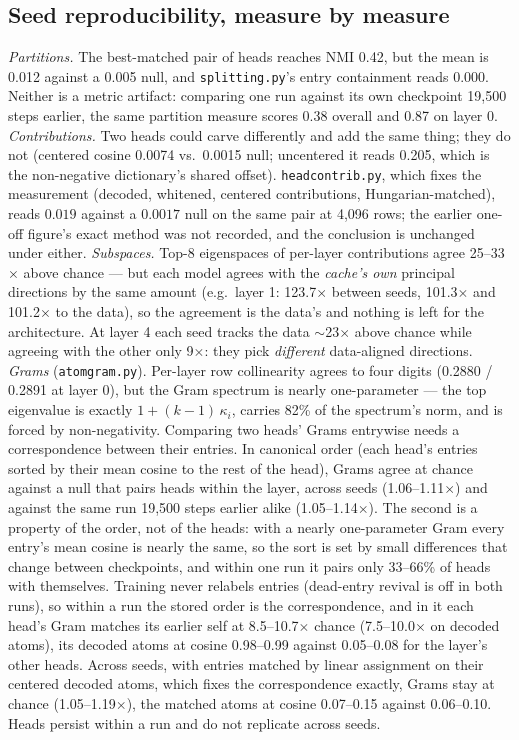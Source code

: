 \subsection{Seed reproducibility, measure by measure}
\label{sec:seedsdetail}

\emph{Partitions.} The best-matched pair of heads reaches NMI 0.42, but
the mean is 0.012 against a 0.005 null, and \texttt{splitting.py}'s entry
containment reads 0.000. Neither is a metric artifact: comparing one run
against its own checkpoint 19{,}500 steps earlier, the same partition
measure scores 0.38 overall and 0.87 on layer 0. \emph{Contributions.}
Two heads could carve differently and add the same thing; they do not
(centered cosine 0.0074 vs.\ 0.0015 null; uncentered it reads 0.205, which
is the non-negative dictionary's shared offset). \texttt{headcontrib.py},
which fixes the measurement (decoded, whitened, centered contributions,
Hungarian-matched), reads $0.019$ against a $0.0017$ null on the same
pair at 4{,}096 rows; the earlier one-off figure's exact method was not
recorded, and the conclusion is unchanged under either. \emph{Subspaces.}
Top-8 eigenspaces of per-layer contributions agree 25--33$\times$ above
chance --- but each model agrees with the \emph{cache's own} principal
directions by the same amount (e.g.\ layer 1: 123.7$\times$ between
seeds, 101.3$\times$ and 101.2$\times$ to the data), so the agreement is
the data's and nothing is left for the architecture. At layer 4 each
seed tracks the data $\sim$23$\times$ above chance while agreeing with the
other only 9$\times$: they pick \emph{different} data-aligned directions.
\emph{Grams} (\texttt{atomgram.py}). Per-layer row collinearity agrees
to four digits (0.2880 / 0.2891 at layer 0), but the Gram spectrum is
nearly one-parameter --- the top eigenvalue is exactly
$1+(k-1)\,\kappa_i$, carries 82\% of the spectrum's norm, and is forced
by non-negativity. Comparing two heads' Grams entrywise needs a
correspondence between their entries. In canonical order (each head's
entries sorted by their mean cosine to the rest of the head), Grams agree
at chance against a null that pairs heads within the layer, across seeds
(1.06--1.11$\times$) and against the same run 19{,}500 steps earlier
alike (1.05--1.14$\times$). The second is a property of the order, not of
the heads: with a nearly one-parameter Gram every entry's mean cosine is
nearly the same, so the sort is set by small differences that change
between checkpoints, and within one run it pairs only 33--66\% of heads
with themselves. Training never relabels entries (dead-entry revival is
off in both runs), so within a run the stored order is the
correspondence, and in it each head's Gram matches its earlier self at
8.5--10.7$\times$ chance (7.5--10.0$\times$ on decoded atoms), its
decoded atoms at cosine 0.98--0.99 against 0.05--0.08 for the layer's
other heads. Across seeds, with entries matched by linear assignment on
their centered decoded atoms, which fixes the correspondence exactly,
Grams stay at chance (1.05--1.19$\times$), the matched atoms at cosine
0.07--0.15 against 0.06--0.10. Heads persist within a run and do not
replicate across seeds.

